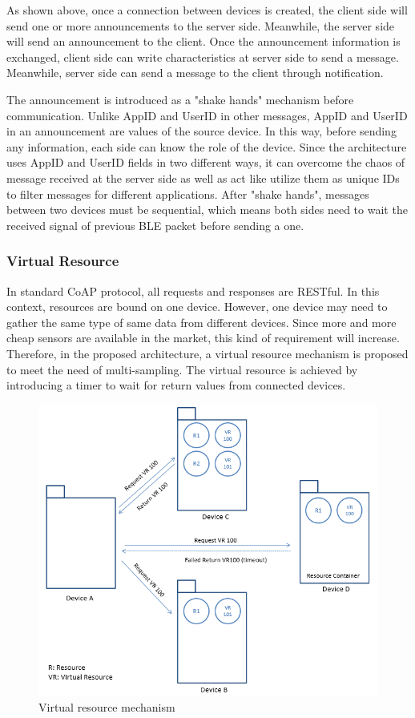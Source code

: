 \documentclass{Nan_Thesis}
\begin{document}
As shown above, once a connection between devices is created, the client side will send one or more announcements to the server side. Meanwhile, the server side will send an announcement to the client. Once the announcement information is exchanged, client side can write characteristics at server side to send a message. Meanwhile, server side can send a message to the client through notification.

The announcement is introduced as a "shake hands" mechanism before communication. Unlike AppID and UserID in other messages, AppID and UserID in an announcement are values of the source device. In this way, before sending any information, each side can know the role of the device. Since the architecture uses AppID and UserID fields in two different ways, it can overcome the chaos of message received at the server side as well as act like utilize them as unique IDs to filter messages for different applications. After "shake hands", messages between two devices must be sequential, which means both sides need to wait the received signal of previous BLE packet before sending a one.
\subsubsection{Virtual Resource}
In standard CoAP protocol, all requests and responses are RESTful. In this context, resources are bound on one device. However, one device may need to gather the same type of same data from different devices. Since more and more cheap sensors are available in the market, this kind of requirement will increase. 
Therefore, in the proposed architecture, a virtual resource mechanism is proposed to meet the need of multi-sampling. The virtual resource is achieved by introducing a timer to wait for return values from connected devices.

\begin{figure}[H]
  \centering 
      \includegraphics[scale=0.8]{pic/virtualresourcemechanism.png} 
  \caption{Virtual resource mechanism}
\end{figure} 
\end{document}
